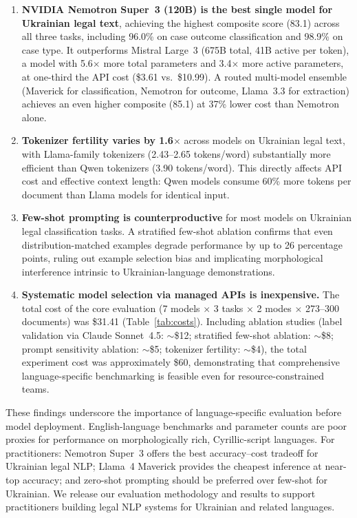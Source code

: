 \documentclass[11pt,a4paper]{article}
\begin{document}
\begin{enumerate}[leftmargin=*]
    \item \textbf{NVIDIA Nemotron Super~3 (120B) is the best single model for Ukrainian legal text}, achieving the highest composite score (83.1) across all three tasks, including 96.0\% on case outcome classification and 98.9\% on case type. It outperforms Mistral Large~3 (675B total, 41B active per token), a model with 5.6$\times$ more total parameters and 3.4$\times$ more active parameters, at one-third the API cost (\$3.61 vs.\ \$10.99). A routed multi-model ensemble (Maverick for classification, Nemotron for outcome, Llama~3.3 for extraction) achieves an even higher composite (85.1) at 37\% lower cost than Nemotron alone.

    \item \textbf{Tokenizer fertility varies by 1.6$\times$} across models on Ukrainian legal text, with Llama-family tokenizers (2.43--2.65 tokens/word) substantially more efficient than Qwen tokenizers (3.90 tokens/word). This directly affects API cost and effective context length: Qwen models consume 60\% more tokens per document than Llama models for identical input.

    \item \textbf{Few-shot prompting is counterproductive} for most models on Ukrainian legal classification tasks. A stratified few-shot ablation confirms that even distribution-matched examples degrade performance by up to 26 percentage points, ruling out example selection bias and implicating morphological interference intrinsic to Ukrainian-language demonstrations.

    \item \textbf{Systematic model selection via managed APIs is inexpensive.} The total cost of the core evaluation (7 models $\times$ 3 tasks $\times$ 2 modes $\times$ 273--300 documents) was \$31.41 (Table~\ref{tab:costs}). Including ablation studies (label validation via Claude Sonnet~4.5: ${\sim}$\$12; stratified few-shot ablation: ${\sim}$\$8; prompt sensitivity ablation: ${\sim}$\$5; tokenizer fertility: ${\sim}$\$4), the total experiment cost was approximately \$60, demonstrating that comprehensive language-specific benchmarking is feasible even for resource-constrained teams.
\end{enumerate}

These findings underscore the importance of language-specific evaluation before model deployment. English-language benchmarks and parameter counts are poor proxies for performance on morphologically rich, Cyrillic-script languages. For practitioners: Nemotron Super~3 offers the best accuracy--cost tradeoff for Ukrainian legal NLP; Llama~4 Maverick provides the cheapest inference at near-top accuracy; and zero-shot prompting should be preferred over few-shot for Ukrainian. We release our evaluation methodology and results to support practitioners building legal NLP systems for Ukrainian and related languages.
\end{document}
